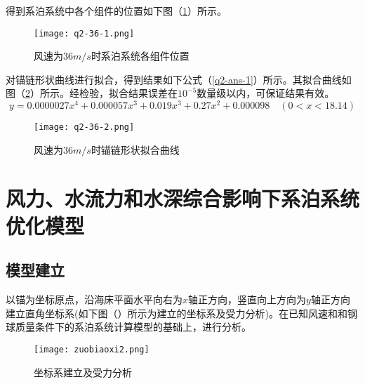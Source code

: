 \documentclass[withoutpreface,bwprint]{cumcmthesis} %
\begin{document}
得到系泊系统中各个组件的位置如下图（\ref{fig:q2-36-1}）所示。
\begin{figure}[h]
\small
\centering
\texttt{[image: q2-36-1.png]}
\caption{风速为$36m/s$时系泊系统各组件位置} \label{fig:q2-36-1}
\end{figure}
对锚链形状曲线进行拟合，得到结果如下公式（\ref{q2-ans-1}）所示。其拟合曲线如图（\ref{fig:q2-36-2}）所示。经检验，拟合结果误差在$10^{-5}$数量级以内，可保证结果有效。
\begin{equation}
	\label{q2-ans-1}
	y = 0.0000027x^4+0.000057x^3+0.019x^3+0.27x^2+0.000098 \quad  (0<x<18.14)
\end{equation}

\begin{figure}[h]
\small
\centering
\texttt{[image: q2-36-2.png]}
\caption{风速为$36m/s$时锚链形状拟合曲线} \label{fig:q2-36-2}
\end{figure}



\newpage
\section{风力、水流力和水深综合影响下系泊系统优化模型}

\subsection{模型建立}
\par 以锚为坐标原点，沿海床平面水平向右为$x$轴正方向，竖直向上方向为$y$轴正方向建立直角坐标系(如下图（）所示为建立的坐标系及受力分析)。在已知风速和和钢球质量条件下的系泊系统计算模型的基础上，进行分析。
\begin{figure}[h]
\small
\centering
\texttt{[image: zuobiaoxi2.png]}
\caption{坐标系建立及受力分析} \label{fig:zuobiaoxi2}
\end{figure}
\end{document}
